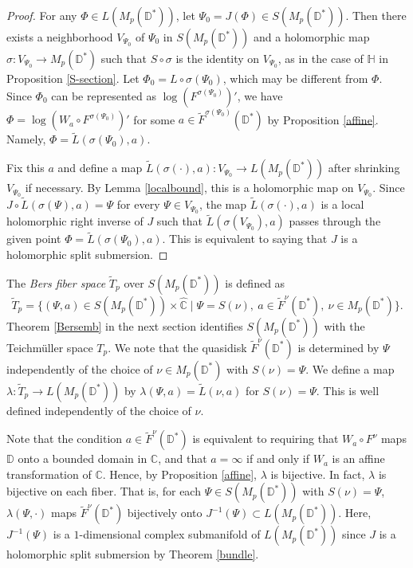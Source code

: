 \documentclass[amstex,12pt,reqno]{amsart}
\theoremstyle{definition}
\begin{document}
\begin{proof}
For any $\Phi \in L(M_p(\mathbb D^*))$, let $\Psi_0=J(\Phi) \in S(M_p(\mathbb D^*))$. Then
there exists a
neighborhood $V_{\Psi_0}$ of $\Psi_0$ in $S(M_p(\mathbb D^*))$ 
and a holomorphic map $\sigma:V_{\Psi_0} \to M_p(\mathbb D^*)$ such that
$S \circ \sigma$ is the identity on $V_{\Psi_0}$, as in the case of 
$\mathbb H$ in Proposition \ref{S-section}. Let $\Phi_0=L \circ \sigma(\Psi_0)$, which may be different 
from $\Phi$.
Since $\Phi_0$ can be represented as $\log (F^{\sigma(\Psi_0)})'$, we have
$\Phi=\log (W_a \circ F^{\sigma(\Psi_0)})'$ for some $a \in \widetilde F^{\sigma(\Psi_0)}(\mathbb D^*)$
by Proposition \ref{affine}. 
Namely, $\Phi=\widetilde L(\sigma(\Psi_0),a)$.

Fix this $a$ and define a map
$\widetilde L(\sigma(\cdot),a):V_{\Psi_0} \to L(M_p(\mathbb D^*))$ after shrinking $V_{\Psi_0}$ if necessary.
By Lemma \ref{localbound}, this is a holomorphic map on $V_{\Psi_0}$.
Since $J \circ \widetilde L(\sigma(\Psi),a)=\Psi$ for every $\Psi \in V_{\Psi_0}$, the map
$\widetilde L(\sigma(\cdot),a)$ is a local holomorphic right inverse of $J$ such that $\widetilde L(\sigma(V_{\Psi_0}),a)$ passes through the given 
point $\Phi=\widetilde L(\sigma(\Psi_0),a)$.
This is equivalent to saying that $J$ is a holomorphic split submersion.
\end{proof}

The {\it Bers fiber space} $\widetilde T_p$ over $S(M_p(\mathbb D^*))$ is defined as
$$
\widetilde T_p=\{(\Psi,a) \in S(M_p(\mathbb D^*)) \times \widehat{\mathbb C} \mid \Psi=S(\nu),
\ a \in \widetilde F^{\nu}(\mathbb D^*),\ \nu \in M_p(\mathbb D^*)\}.
$$
Theorem \ref{Bersemb} in the next section identifies $S(M_p(\mathbb D^*))$ with
the Teichm\"uller space $T_p$. We note that the quasidisk $\widetilde F^{\nu}(\mathbb D^*)$ is determined by $\Psi$
independently of the choice of $\nu \in M_p(\mathbb D^*)$ with $S(\nu)=\Psi$.
We define a map $\lambda: \widetilde T_p \to L(M_p(\mathbb D^*))$ by
$\lambda(\Psi,a)=\widetilde L(\nu,a)$ for $S(\nu)=\Psi$. This is well defined independently of
the choice of $\nu$.

Note that the condition $a \in \widetilde F^{\nu}(\mathbb D^*)$ is equivalent to requiring that
$W_a \circ F^{\nu}$ maps $\mathbb D$ onto a bounded domain in $\mathbb C$, and 
that $a=\infty$ if and only if $W_a$ is an affine transformation of $\mathbb C$.
Hence, by Proposition \ref{affine},
$\lambda$ is bijective.
In fact, $\lambda$ is bijective on each fiber. That is, for each $\Psi \in S(M_p(\mathbb D^*))$ with $S(\nu)=\Psi$, 
$\lambda(\Psi,\cdot)$ maps $\widetilde F^{\nu}(\mathbb D^*)$ bijectively onto 
$J^{-1}(\Psi) \subset L(M_p(\mathbb D^*))$.
Here, $J^{-1}(\Psi)$ is a $1$-dimensional complex submanifold of $L(M_p(\mathbb D^*))$ since 
$J$ is a holomorphic split submersion by Theorem \ref{bundle}.
\end{document}
